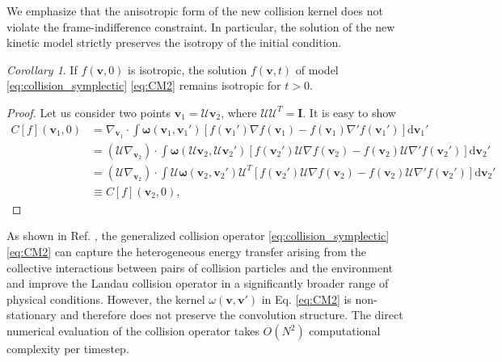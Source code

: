 \documentclass[preprint,1p,times]{elsarticle}
\theoremstyle{definition}
\theoremstyle{remark}
\newtheorem{corollary}{Corollary}
\begin{document}
We emphasize that the anisotropic form of the new collision kernel does not violate the frame-indifference constraint. In particular, the solution of the new kinetic model strictly preserves the isotropy of the initial condition. 
\begin{corollary}
\label{cor:radial_symmetry}
If $f(\boldsymbol{v}, 0)$ is isotropic, the solution $f(\boldsymbol{v}, t)$ of model  \eqref{eq:collision_symplectic} \eqref{eq:CM2} remains isotropic for $t > 0$.   
\end{corollary}
\begin{proof}
Let us consider two points $\boldsymbol{v}_1 = \mathcal{U} \boldsymbol{v}_2$, where $\mathcal{U} \mathcal{U}^T = \boldsymbol{I}$. It is easy to show 
\begin{equation*}
\begin{split}
C[f](\boldsymbol{v}_1,0) &= \nabla_{\boldsymbol{v}_1} \cdot \int \boldsymbol\omega(\boldsymbol{v}_1, \boldsymbol{v}_1') \left[ f(\boldsymbol{v}_1') \nabla f(\boldsymbol{v}_1) - f(\boldsymbol{v}_1) \nabla' f(\boldsymbol{v}_1') \right] \mathrm{d}\boldsymbol{v}_1' \\
&= (\mathcal{U}  \nabla_{\boldsymbol{v}_2}) \cdot \int \boldsymbol\omega(\mathcal{U} \boldsymbol{v}_2, \mathcal{U}\boldsymbol{v}_2') \left[ f(\boldsymbol{v}_2') \mathcal{U} \nabla f(\boldsymbol{v}_2) - f(\boldsymbol{v}_2) \mathcal{U} \nabla' f(\boldsymbol{v}_2') \right] \mathrm{d}\boldsymbol{v}_2' \\
&= (\mathcal{U}  \nabla_{\boldsymbol{v}_2}) \cdot \int \mathcal{U} \boldsymbol\omega( \boldsymbol{v}_2, \boldsymbol{v}_2') \mathcal{U}^T \left[ f(\boldsymbol{v}_2') \mathcal{U} \nabla f(\boldsymbol{v}_2) - f(\boldsymbol{v}_2) \mathcal{U} \nabla' f(\boldsymbol{v}_2') \right] \mathrm{d}\boldsymbol{v}_2' \\
&\equiv C[f](\boldsymbol{v}_2, 0),
\end{split}    
\end{equation*}
\end{proof}


As shown in Ref. \cite{zhao2025data}, the generalized collision operator \eqref{eq:collision_symplectic} \eqref{eq:CM2} can capture the heterogeneous energy transfer arising from the collective interactions between pairs of collision particles and the environment and improve the Landau collision operator in a significantly broader range of physical conditions. However, the kernel $\omega(\boldsymbol{v}, \boldsymbol{v}')$ in Eq. \eqref{eq:CM2} is non-stationary and therefore does not preserve the convolution structure. The direct numerical evaluation of the collision operator takes $O(N^2)$ computational complexity per timestep.
\end{document}
